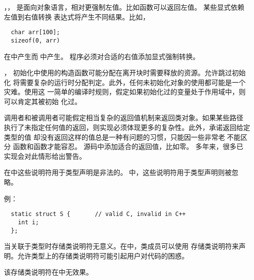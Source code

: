 ，，
\diffrat \cpp{}是面向对象语言，相对更强制左值。比如函数可以返回左值。
\diffeff \semchg 某些显式依赖左值到右值转换的\c{}表达式将产生不同结果。比如，
\begin{lstlisting}
  char arr[100];
  sizeof(0, arr)
\end{lstlisting}
在\cpp{}中产生而在\c{}中产生。
\diffdiff 程序必须对合适的右值添加显式强制转换。
\diffuse \rare

，
\diffrat 初始化中使用的构造函数可能分配在离开块时需要释放的资源。允许跳过初始化
将需要复杂的运行时分配判定。此外，任何未初始化对象的使用都可能是一个灾难。使用这
一简单的编译时规则，\cpp{}假定如果初始化过的变量处于作用域中，则可以肯定其被初始
化过。
\diffeff \semdel
\diffdiff \semtrans
\diffuse \seldom

\diffrat 调用者和被调用者可能假定相当复杂的返回值机制来返回类对象。如果某些路径
执行了未指定任何值的返回，则实现必须体现更多的复杂性。此外，承诺返回给定类型的值
却没有返回这样的值总是一种有问题的习惯，只能因一些非常老的\c{}不能区分
函数和函数才能容忍。
\diffeff \semdel
\diffdiff \semtrans 源码中添加适合的返回值，比如零。
\diffuse \seldom 多年来，很多已有\c{}实现会对此情形给出警告。

在\cpp{}中这些说明符用于类型声明是非法的。在\c{}中，这些说明符用于类型声明则被忽
略。

例：
\begin{lstlisting}
  static struct S {       // valid C, invalid in C++
    int i;
  };
\end{lstlisting}
\diffrat 当关联于类型时存储类说明符无意义。在\cpp{}中，类成员可以使用
存储类说明符来声明。允许类型上的存储类说明符可能引起用户对代码的困惑。
\diffeff \semdel
\diffdiff \syntrans
\diffuse \seldom

\diffrat 该存储类说明符在\cpp{}中无效果。
\diffeff \semdel
\diffdiff \syntrans
\diffuse \common



